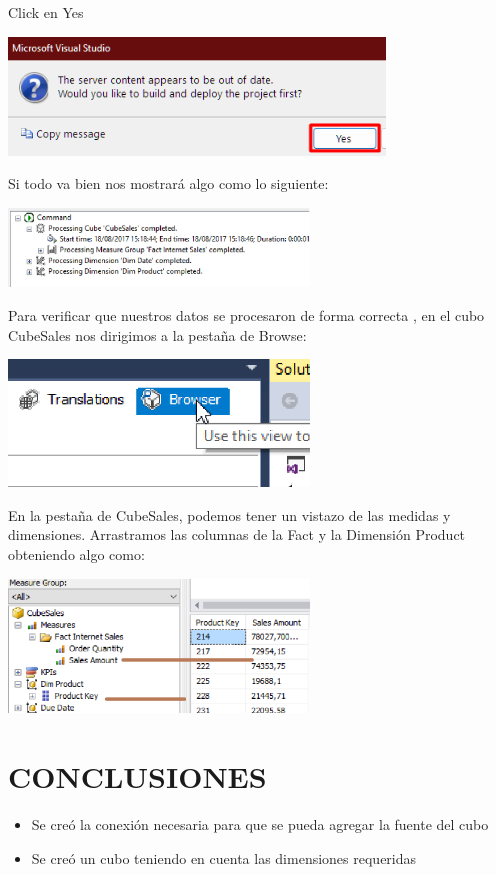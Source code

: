 \documentclass[12pt,letterpaper]{article}
\begin{document}
Click en Yes

\begin{center}
    \includegraphics[width=10cm]{./img/img19.png}
\end{center}

Si todo va bien nos mostrará algo como lo siguiente:

\begin{center}
    \includegraphics[width=8cm]{./img/img20.png}
\end{center}

Para verificar que nuestros datos se procesaron de forma correcta , en el cubo CubeSales nos dirigimos a la pestaña de Browse:

\begin{center}
    \includegraphics[width=8cm]{./img/img21.png}
\end{center}

En la pestaña de CubeSales, podemos tener un vistazo de las medidas y dimensiones. Arrastramos las columnas de la Fact y la Dimensión Product obteniendo algo como:

\begin{center}
    \includegraphics[width=8cm]{./img/img22.png}
\end{center}

\newpage
\section{CONCLUSIONES}
\begin{itemize}
    \item Se creó la conexión necesaria para que se pueda agregar la fuente del cubo
    \item Se creó un cubo teniendo en cuenta las dimensiones requeridas
\end{itemize}
\end{document}
